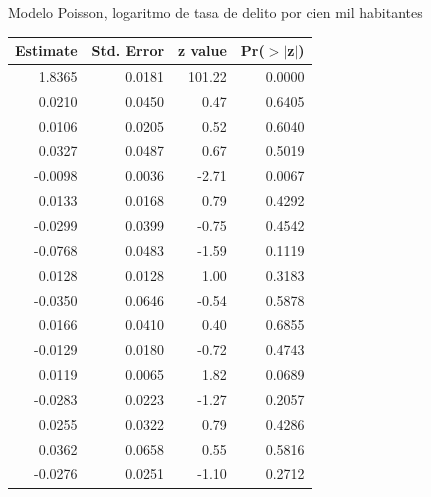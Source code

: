 \documentclass[ignorenonframetext,]{beamer}
\begin{document}
\begin{frame}{Modelo Poisson, logaritmo de tasa de delito por cien mil
habitantes}

\begin{table}[ht]
\centering
{\small
\begin{tabular}{rrrr}
  \hline
Estimate & Std. Error & z value & Pr($>$$|$z$|$) \\ 
  \hline
1.8365 & 0.0181 & 101.22 & 0.0000 \\ 
  0.0210 & 0.0450 & 0.47 & 0.6405 \\ 
  0.0106 & 0.0205 & 0.52 & 0.6040 \\ 
  0.0327 & 0.0487 & 0.67 & 0.5019 \\ 
  -0.0098 & 0.0036 & -2.71 & 0.0067 \\ 
  0.0133 & 0.0168 & 0.79 & 0.4292 \\ 
  -0.0299 & 0.0399 & -0.75 & 0.4542 \\ 
  -0.0768 & 0.0483 & -1.59 & 0.1119 \\ 
  0.0128 & 0.0128 & 1.00 & 0.3183 \\ 
  -0.0350 & 0.0646 & -0.54 & 0.5878 \\ 
  0.0166 & 0.0410 & 0.40 & 0.6855 \\ 
  -0.0129 & 0.0180 & -0.72 & 0.4743 \\ 
  0.0119 & 0.0065 & 1.82 & 0.0689 \\ 
  -0.0283 & 0.0223 & -1.27 & 0.2057 \\ 
  0.0255 & 0.0322 & 0.79 & 0.4286 \\ 
  0.0362 & 0.0658 & 0.55 & 0.5816 \\ 
  -0.0276 & 0.0251 & -1.10 & 0.2712 \\ 
   \hline
\end{tabular}
}
\end{table}

\end{frame}
\end{document}

